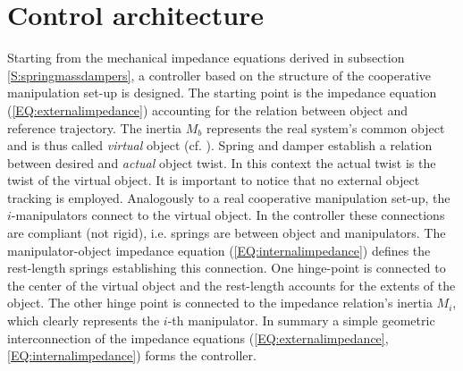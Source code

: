\documentclass[a4paper,twoside, openright,12pt]{report}
\begin{document}
\section{Control architecture}
Starting from the mechanical impedance equations derived in subsection \ref{S:springmassdampers}, a controller based on the structure of the cooperative manipulation set-up is designed. The starting point is the impedance equation (\ref{EQ:externalimpedance}) accounting for the relation between object and reference trajectory. The inertia $M_b$ represents the real system's common object and is thus called \emph{virtual} object (cf. \cite{Stramigioli_01b}). Spring and damper establish a relation between desired and \emph{actual} object twist. In this context the actual twist is the twist of the virtual object. It is important to notice that no external object tracking is employed. Analogously to a real cooperative manipulation set-up, the $i$-manipulators connect to the virtual object. In the controller these connections are compliant (not rigid), i.e. springs are between object and manipulators. The manipulator-object impedance equation (\ref{EQ:internalimpedance}) defines the rest-length springs establishing this connection. One hinge-point is connected to the center of the virtual object and the rest-length accounts for the extents of the object. The other hinge point is connected to the impedance relation's inertia  $M_i$, which clearly represents the $i$-th manipulator. In summary a simple geometric interconnection of the impedance equations (\ref{EQ:externalimpedance},\ref{EQ:internalimpedance}) forms the controller.
\end{document}
